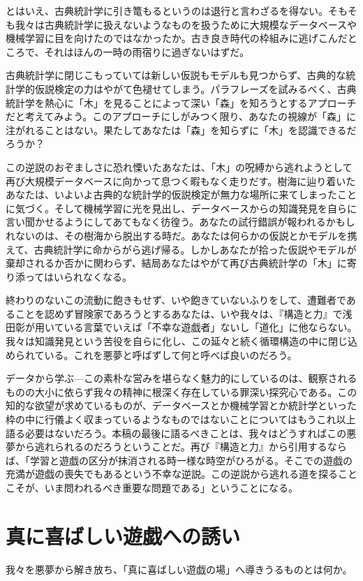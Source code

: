 とはいえ、古典統計学に引き篭もるというのは退行と言わざるを得ない。そもそも我々は古典統計学に扱えないようなものを扱うために大規模なデータベースや機械学習に目を向けたのではなかったか。古き良き時代の枠組みに逃げこんだところで、それはほんの一時の雨宿りに過ぎないはずだ。

古典統計学に閉じこもっていては新しい仮説もモデルも見つからず、古典的な統計学的仮説検定の力はやがて色褪せてしまう。パラフレーズを試みるべく、古典統計学を熱心に「木」を見ることによって深い「森」を知ろうとするアプローチだと考えてみよう。このアプローチにしがみつく限り、あなたの視線が「森」に注がれることはない。果たしてあなたは「森」を知らずに「木」を認識できるだろうか？

この逆説のおぞましさに恐れ慄いたあなたは、「木」の呪縛から逃れようとして再び大規模データベースに向かって息つく暇もなく走りだす。樹海に辿り着いたあなたは、いよいよ古典的な統計学的仮説検定が無力な場所に来てしまったことに気づく。そして機械学習に光を見出し、データベースからの知識発見を自らに言い聞かせるようにしてあてもなく彷徨う。あなたの試行錯誤が報われるかもしれないのは、その樹海から脱出する時だ。あなたは何らかの仮説とかモデルを携えて、古典統計学に命からがら逃げ帰る。しかしあなたが拾った仮説やモデルが棄却されるか否かに関わらず、結局あなたはやがて再び古典統計学の「木」に寄り添ってはいられなくなる。

終わりのないこの流動に飽きもせず、いや飽きていないふりをして、遭難者であることを認めず冒険家であろうとするあなたは、いや我々は、『構造と力』で浅田彰が用いている言葉でいえば「不幸な遊戯者」ないし「道化」に他ならない。我々は知識発見という苦役を自らに化し、この延々と続く循環構造の中に閉じ込められている。これを悪夢と呼ばずして何と呼べば良いのだろう。

データから学ぶ---この素朴な営みを堪らなく魅力的にしているのは、観察されるものの大小に依らず我々の精神に根深く存在している罪深い探究心である。この知的な欲望が求めているものが、データベースとか機械学習とか統計学といった枠の中に行儀よく収まっているようなものではないことについてはもうこれ以上語る必要はないだろう。本稿の最後に語るべきことは、我々はどうすればこの悪夢から逃れられるのだろうということだ。再び『構造と力』から引用するならば、「学習と遊戯の区分が抹消される時一様な時空がひろがる。そこでの遊戯の充満が遊戯の喪失でもあるという不幸な逆説。この逆説から逃れる道を探ることこそが、いま問われるべき重要な問題である」ということになる。

\section{真に喜ばしい遊戯への誘い}
我々を悪夢から解き放ち、「真に喜ばしい遊戯の場」へ導きうるものとは何か。

